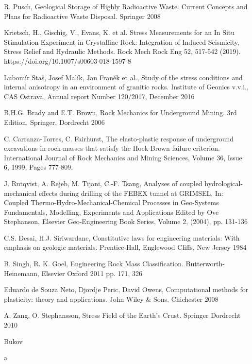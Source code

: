 \documentclass[a4paper]{article}
\begin{document}
\begin{thebibliography}{32}
	R. Pusch, Geological Storage of Highly Radioactive Waste. Current
	Concepts and Plans for Radioactive Waste Disposal. Springer 2008
	
	Krietsch, H., Gischig, V., Evans, K. et al. Stress Measurements for
	an In Situ Stimulation Experiment in Crystalline Rock: Integration
	of Induced Seismicity, Stress Relief and Hydraulic Methods. Rock
	Mech Rock Eng 52, 517-542 (2019). https://doi.org/10.1007/s00603-018-1597-8 
	
	Lubomír Staš, Josef Malík, Jan Franěk et al., Study of the stress conditions
	and internal anisotropy in an environment of granitic rocks. Institute
	of Geonics v.v.i., CAS Ostrava, Annual report Number 120/2017,
	December 2016
	
	B.H.G. Brady and E.T. Brown, Rock Mechanics for Underground Mining.
	3rd Edition, Springer, Dordrecht 2006
	
	 C. Carranza-Torres, C. Fairhurst, The elasto-plastic response of underground
	excavations in rock masses that satisfy the Hoek-Brown failure
	criterion. International Journal of Rock Mechanics and Mining Sciences,
	Volume 36, Issue 6, 1999, Pages 777-809.
	
		J. Rutqvist, A. Rejeb, M. Tijani, C.-F. Tsang, Analyses of coupled
	hydrological-mechanical effects during drilling of the FEBEX tunnel
	at GRIMSEL. In: Coupled Thermo-Hydro-Mechanical-Chemical Processes
	in Geo-Systems Fundamentals, Modelling, Experiments and Applications
	Edited by Ove Stephanson, Elsevier Geo-Engineering Book
	Series, Volume 2, (2004), pp. 131-136
	
	 C.S. Desai, H.J. Siriwardane, Constitutive laws for engineering materials:
	With emphasis on geologic materials. Prentice-Hall, Englewood
	Cliffs, New Jersey 1984
	
	 B. Singh, R. K. Goel, Engineering Rock Mass Classification.
	Butterworth-Heinemann, Elsevier Oxford 2011 pp. 171, 326
	
	 Eduardo de Souza Neto, Djordje Peric, David Owens, Computational
	methods for plasticity: theory and applications. John Wiley \& Sons,
	Chichester 2008
	
	 A. Zang, O. Stephansson, Stress Field of the Earth's Crust. Springer
	Dordrecht 2010
	
	 Bukov
	
	 a
	

\end{thebibliography}
\end{document}

